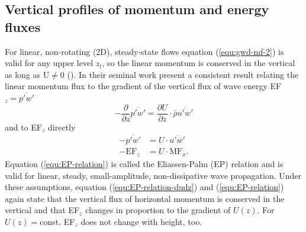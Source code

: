 \subsection*{Vertical profiles of momentum and energy fluxes}
For linear, non-rotating (2D), steady-state flows equation (\ref{equ:gwd-mf-2}) is valid for any upper level $z_t$, so the linear momentum is conserved in the vertical as long as U$\neq 0$ (\cite[]{durran_lee_2003}). In their seminal work \textcite[]{eliassen_transfer_1960} present a consistent result relating the linear momentum flux to the gradient of the vertical flux of wave energy EF$_z = \overbar{p'w'}$
\begin{equation}
    -\frac{\partial}{\partial z}\overbar{p'w'} = \frac{\partial U}{\partial z} \cdot \bar{\rho} \overbar{u'w'}
    \label{equ:EP-relation-dudz}
\end{equation}
and to EF$_z$ directly
\begin{equation}
    \begin{aligned}
    -\overbar{p'w'}& = U \cdot \overbar{u'w'} \\
    -\mathrm{EF}_z& = U \cdot \mathrm{MF}_x.
    \end{aligned}
    \label{equ:EP-relation}
\end{equation}
Equation (\ref{equ:EP-relation}) is called the Eliassen-Palm (EP) relation and is valid for linear, steady, small-amplitude, non-dissipative wave propagation. Under these assumptions, equation (\ref{equ:EP-relation-dudz}) and (\ref{equ:EP-relation}) again state that the vertical flux of horizontal momentum is conserved in the vertical and that EF$_z$ changes in proportion to the gradient of $U(z)$. For $U(z)=$const. EF$_z$ does not change with height, too.

